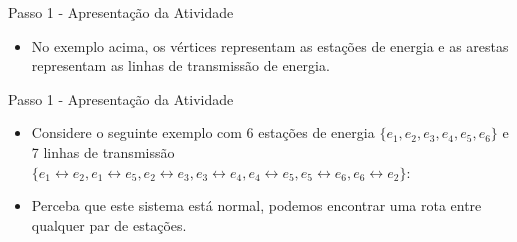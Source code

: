 \documentclass{beamer}
\begin{document}
\begin{frame}{Passo 1 - Apresentação da Atividade}


\begin{itemize}
   
\item <1-> No exemplo acima, os vértices representam as estações de energia e as arestas representam as linhas de transmissão de energia.


\end{itemize}



\end{frame}


\begin{frame}{Passo 1 - Apresentação da Atividade}


\begin{itemize}
   
\item <1-> Considere o seguinte exemplo com 6 estações de energia $\{e_1,e_2,e_3,e_4,e_5, e_6\}$ e 7 linhas de transmissão $\{ e_1 \leftrightarrow e_2 ,e_1 \leftrightarrow e_5, e_2 \leftrightarrow e_3, e_3 \leftrightarrow e_4, e_4 \leftrightarrow e_5, e_5 \leftrightarrow e_6, e_6 \leftrightarrow e_2\}$:




\item <2-> Perceba que este sistema está normal, podemos encontrar uma rota entre qualquer par de estações.


\end{itemize}



\end{frame}
\end{document}
